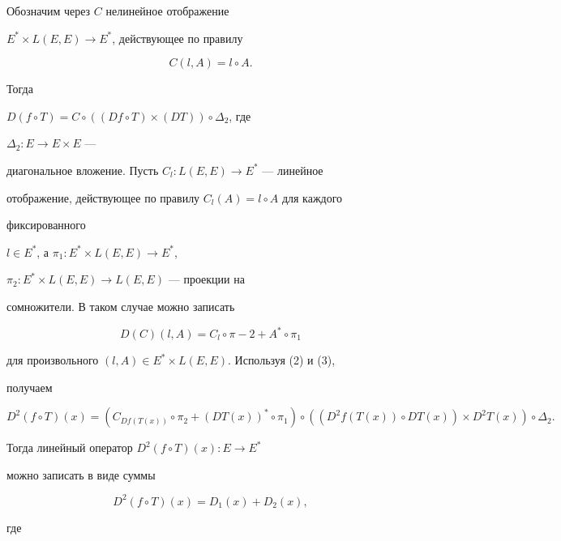 \begin{pf}


Обозначим через $C$ нелинейное отображение


$E^*\times L(E,E)\to E^*$, действующее по правилу


\begin{equation}


C(l,A)=l\circ A.


\end{equation}


Тогда


$D(f\circ T)=C\circ((Df\circ T)\times(DT))\circ\Delta_2$, где


$\Delta_2:E\to E\times E$ ---


диагональное вложение. Пусть $C_l:L(E,E)\to E^*$ --- линейное


отображение, действующее по правилу $C_l(A)=l\circ A$ для каждого


фиксированного


$l\in E^*$, а $\pi_1:E^*\times L(E,E)\to E^*$,


$\pi_2:E^*\times L(E,E)\to L(E,E)$ --- проекции на


сомножители. В таком случае можно записать


\begin{equation}


D(C)(l,A)=C_l\circ\pi-2+A^*\circ\pi_1


\end{equation}


для произвольного $(l,A)\in E^*\times L(E,E)$. Используя (2) и (3),


получаем


$$


D^2(f\circ T)(x)=(C_{Df(T(x))}\circ\pi_2+


(DT(x))^*\circ\pi_1)\circ


((D^2f(T(x))\circ DT(x))\times D^2T(x))\circ\Delta_2.


$$


Тогда линейный оператор $D^2(f\circ T)(x):E\to E^*$


можно записать в виде суммы


\begin{equation}


D^2(f\circ T)(x)=D_1(x)+D_2(x),


\end{equation}


где


\begin{align*}



\end{align*}
\end{pf}
